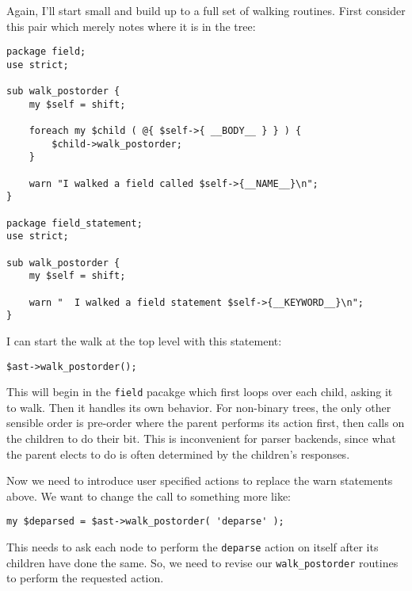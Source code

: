 Again, I'll start small and build up to a full set of walking routines.
First consider this pair which merely notes where it is in the tree:

\begin{verbatim}
package field;
use strict;

sub walk_postorder {
    my $self = shift;

    foreach my $child ( @{ $self->{ __BODY__ } } ) {
        $child->walk_postorder;
    }

    warn "I walked a field called $self->{__NAME__}\n";
}

package field_statement;
use strict;

sub walk_postorder {
    my $self = shift;

    warn "  I walked a field statement $self->{__KEYWORD__}\n";
}
\end{verbatim}

I can start the walk at the top level with this statement:

\begin{verbatim}
$ast->walk_postorder();
\end{verbatim}

This will begin in the \verb+field+ pacakge which first loops over
each child, asking it to walk.  Then it handles its own behavior.
For non-binary trees, the only other sensible order is pre-order where
the parent performs its action first, then calls on the children to do
their bit.  This is inconvenient for parser backends, since what the
parent elects to do is often determined by the children's responses.

Now we need to introduce user specified actions to replace the warn
statements above.  We want to change the call to something more like:

\begin{verbatim}
my $deparsed = $ast->walk_postorder( 'deparse' );
\end{verbatim}

This needs to ask each node to perform the \verb+deparse+ action on itself
after its children have done the same.  So, we need to revise our
\verb+walk_postorder+ routines to perform the requested action.

